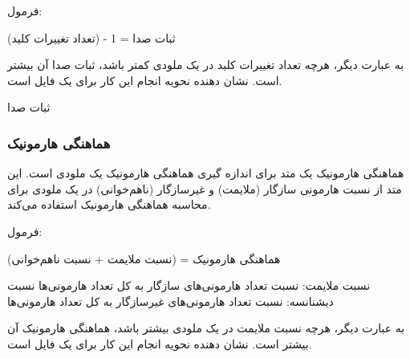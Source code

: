 فرمول:

ثبات صدا = 1 - (تعداد تغییرات کلید)

به عبارت دیگر، هرچه تعداد تغییرات کلید در یک ملودی کمتر باشد، ثبات صدا آن بیشتر است.
 نشان دهنده نحویه انجام این کار برای یک فایل  است.


\begin{LTR}
      \begin{algorithm}
            \caption{ثبات صدا }
            \setmainfont{Times New Roman}
            \label{alg:analyze_tonal_stability}
            \begin{algorithmic}
            \end{algorithmic}
      \end{algorithm}
\end{LTR}

\subsubsection{ هماهنگی هارمونیک  }

هماهنگی هارمونیک یک متد برای اندازه گیری هماهنگی هارمونیک یک ملودی است. این متد از نسبت هارمونی سازگار (ملایمت) و غیرسازگار (نا‌هم‌خوانی) در یک ملودی برای محاسبه هماهنگی هارمونیک استفاده می‌کند.

فرمول:

هماهنگی هارمونیک = (نسبت ملایمت + نسبت نا‌هم‌خوانی)

نسبت ملایمت: نسبت تعداد هارمونی‌های سازگار به کل تعداد هارمونی‌ها
نسبت دیشنانسه: نسبت تعداد هارمونی‌های غیرسازگار به کل تعداد هارمونی‌ها

به عبارت دیگر، هرچه نسبت ملایمت در یک ملودی بیشتر باشد، هماهنگی هارمونیک آن بیشتر است.
 نشان دهنده نحویه انجام این کار برای یک فایل  است.

